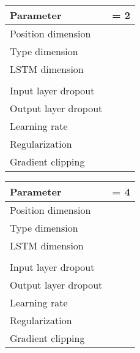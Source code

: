 \documentclass[11pt,a4paper]{article}
\begin{document}
\begin{table}[ht!]
            \vspace{0.5cm}
            
			\begin{subtable}[ht!]{0.4\textwidth}
	             \begin{tabular}{|l|r|}
	                 \hline 
	                 Parameter &  = 2 \\
	                 \hline \hline
	                 Position dimension   &  \\
	                 Type dimension 	  &  \\
	                 LSTM dimension 	  &  \\
	                 				  &  \\
	                 Input layer dropout 	  &  \\
	                 Output layer dropout 	  &  \\
	                 Learning rate 			  &  \\
	                 Regularization 		  &   \\
	                 Gradient clipping		  &  \\
	                 \hline
	             \end{tabular}
             	\subcaption{}
             	\label{tab:params_c}
			\end{subtable}
            
            \vspace{0.5cm}
            
            \begin{subtable}[ht!]{0.4\textwidth}
	             \begin{tabular}{|l|r|}
	                 \hline 
	                 Parameter &  = 4 \\
	                 \hline \hline
	                 Position dimension   &  \\
	                 Type dimension 	  &  \\
	                 LSTM dimension 	  &  \\
	                 				  &  \\
	                 Input layer dropout 	  &  \\
	                 Output layer dropout 	  &  \\
	                 Learning rate 			  &  \\
	                 Regularization 		  &   \\
	                 Gradient clipping		  &  \\
	                 \hline
	             \end{tabular}
             	\subcaption{}
             	\label{tab:params_d}
			\end{subtable}
	  \end{table}  
	
\end{document}
